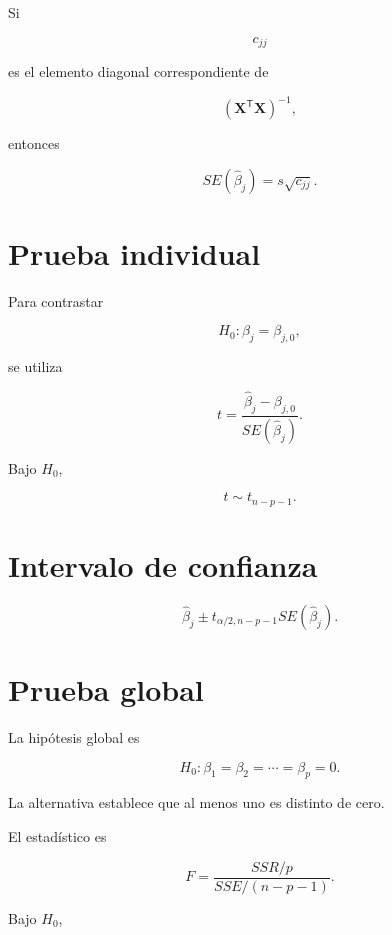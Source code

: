 \documentclass[
  spanish,
  10.5pt,
  letterpaper,
  DIV=11,
  numbers=noendperiod,
  oneside,
  open=any]{scrreprt}
\theoremstyle{definition}
\theoremstyle{definition}
\theoremstyle{plain}
\theoremstyle{remark}
\begin{document}

Si

\[
c_{jj}
\]

es el elemento diagonal correspondiente de

\[
\left(
\mathbf{X}^{\mathsf T}\mathbf{X}
\right)^{-1},
\]

entonces

\[
SE
(
\widehat{\beta}_j
)
=
s\sqrt{c_{jj}}.
\]

\section*{Prueba individual}\label{prueba-individual}


Para contrastar

\[
H_0:\beta_j=\beta_{j,0},
\]

se utiliza

\[
t
=
\frac{
\widehat{\beta}_j-\beta_{j,0}
}{
SE(\widehat{\beta}_j)
}.
\]

Bajo \(H_0\),

\[
t
\sim
t_{n-p-1}.
\]

\section*{Intervalo de confianza}\label{intervalo-de-confianza}


\[
\widehat{\beta}_j
\pm
t_{\alpha/2,n-p-1}
SE(\widehat{\beta}_j).
\]

\section*{Prueba global}\label{prueba-global}


La hipótesis global es

\[
H_0:
\beta_1=\beta_2=\cdots=\beta_p=0.
\]

La alternativa establece que al menos uno es distinto de cero.

El estadístico es

\[
F
=
\frac{
SSR/p
}{
SSE/(n-p-1)
}.
\]

Bajo \(H_0\),
\end{document}
